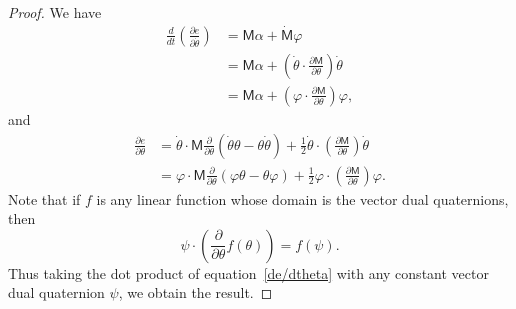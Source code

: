 \documentclass[reqno,12pt]{amsart}
\begin{document}
\begin{proof}
We have
\begin{equation}
\begin{aligned}
\frac d{dt}\left(\frac{\partial e}{\partial \dot\theta}\right)
&= \mathsf M\alpha + \dot{\mathsf M} \varphi \\
&= \mathsf M\alpha + \left(\dot\theta \cdot \frac{\partial \mathsf M}{\partial\theta}\right) \dot\theta \\
& = \mathsf M\alpha + \left(\varphi \cdot \frac{\partial \mathsf M}{\partial\theta}\right) \varphi,
\end{aligned}
\end{equation}
and
\begin{equation}
\label{de/dtheta}
\begin{aligned}
\frac{\partial e}{\partial \theta}
&= \dot \theta \cdot \mathsf M \frac{\partial}{\partial\theta}(\dot\theta \theta - \theta \dot\theta) + \tfrac12 \dot\theta \cdot \left(\frac{\partial \mathsf M}{\partial\theta}\right) \dot\theta \\
&= \varphi \cdot \mathsf M \frac{\partial}{\partial\theta}(\varphi \theta - \theta \varphi) + \tfrac12 \varphi \cdot \left(\frac{\partial \mathsf M}{\partial\theta}\right) \varphi .
\end{aligned}
\end{equation}
Note that if $f$ is any linear function whose domain is the vector dual quaternions, then
\begin{equation}
\psi \cdot \left(\frac{\partial}{\partial \theta} f(\theta)\right) = f(\psi) .
\end{equation}
Thus taking the dot product of equation~\eqref{de/dtheta} with any constant vector dual quaternion $\psi$, we obtain the result.
\end{proof}

\end{document}
